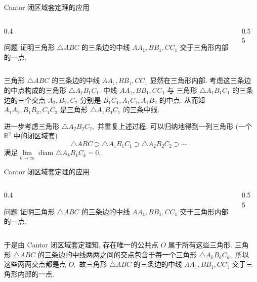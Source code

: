 
\begin{frame}{Cantor 闭区域套定理的应用}

\begin{columns}
\begin{column}{0.4\textwidth}
\begin{block}{问题}
证明三角形 $\triangle ABC$ 的三条边的中线 $AA_1, BB_1, CC_1$ 交于三角形内部的一点.
\end{block}
\end{column}
\begin{column}{0.55\textwidth}

\end{column}
\end{columns}

\pause

三角形 $\triangle ABC$ 的三条边的中线 $AA_1, BB_1, CC_1$ 显然在三角形内部. 考虑这三条边的中点构成的三角形 $\triangle A_1B_1C_1.$
中线 $AA_1, BB_1, CC_1$ 与 三角形 $\triangle A_1B_1C_1$ 的三条边的三个交点 $A_2, B_2, C_2$ 分别是 $B_1C_1, A_1C_1, A_1B_2$ 的中点.
从而知 $A_1A_2, B_1B_2, C_1C_2$ 是三角形 $\triangle A_1B_1C_1$ 的三条中线.

\pause

进一步考虑三角形 $\triangle A_2B_2C_2,$ 并重复上述过程, 可以归纳地得到一列三角形 (一个 $\mathbb{R}^2$ 中的闭区域套)
\[\triangle ABC \supset \triangle A_1B_1C_1 \supset \triangle A_2B_2C_2 \supset \cdots\]
满足$\lim\limits_{k \to \infty} \operatorname{diam} \triangle A_kB_kC_k = 0.$

\end{frame}


\begin{frame}{Cantor 闭区域套定理的应用}

\begin{columns}
\begin{column}{0.4\textwidth}
\begin{block}{问题}
证明三角形 $\triangle ABC$ 的三条边的中线 $AA_1, BB_1, CC_1$ 交于三角形内部的一点.
\end{block}
\end{column}
\begin{column}{0.55\textwidth}

\end{column}
\end{columns}

\pause
\vspace{2em}

于是由 Cantor 闭区域套定理知, 存在唯一的公共点 $O$ 属于所有这些三角形. 三角形 $\triangle ABC$ 的三条边的中线两两之间的交点包含于每一个三角形 $\triangle A_kB_kC_k,$
所以这些两两交点都是点 $O,$ 故三角形 $\triangle ABC$ 的三条边的中线 $AA_1, BB_1, CC_1$ 交于三角形内部的一点.

\end{frame}

